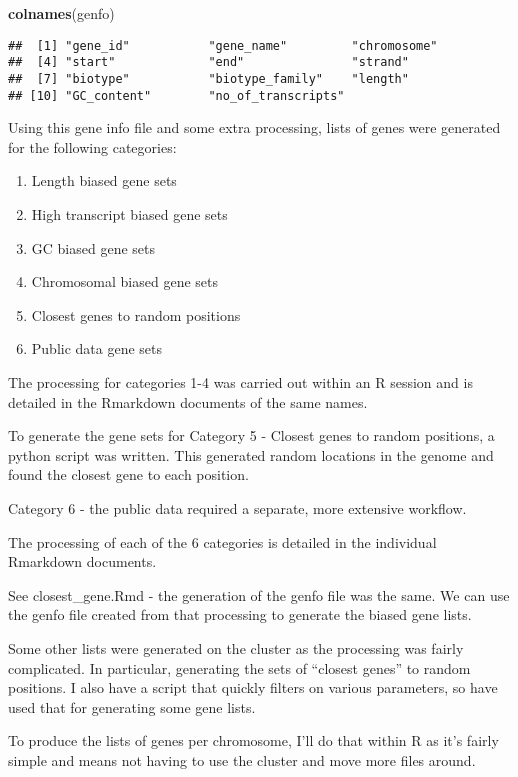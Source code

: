 \documentclass[]{article}
\newenvironment{Shaded}{\begin{snugshade}}{\end{snugshade}}
\newcommand{\KeywordTok}[1]{\textcolor[rgb]{0.13,0.29,0.53}{\textbf{#1}}}
\newcommand{\NormalTok}[1]{#1}
\providecommand{\tightlist}{%
  \setlength{\itemsep}{0pt}\setlength{\parskip}{0pt}}
\begin{document}
\begin{Shaded}
\begin{Highlighting}[]
\KeywordTok{colnames}\NormalTok{(genfo)}
\end{Highlighting}
\end{Shaded}

\begin{verbatim}
##  [1] "gene_id"           "gene_name"         "chromosome"       
##  [4] "start"             "end"               "strand"           
##  [7] "biotype"           "biotype_family"    "length"           
## [10] "GC_content"        "no_of_transcripts"
\end{verbatim}

Using this gene info file and some extra processing, lists of genes were
generated for the following categories:

\begin{enumerate}
\def\labelenumi{\arabic{enumi}.}
\tightlist
\item
  Length biased gene sets
\item
  High transcript biased gene sets
\item
  GC biased gene sets
\item
  Chromosomal biased gene sets
\item
  Closest genes to random positions
\item
  Public data gene sets
\end{enumerate}

The processing for categories 1-4 was carried out within an R session
and is detailed in the Rmarkdown documents of the same names.

To generate the gene sets for Category 5 - Closest genes to random
positions, a python script was written. This generated random locations
in the genome and found the closest gene to each position.

Category 6 - the public data required a separate, more extensive
workflow.

The processing of each of the 6 categories is detailed in the individual
Rmarkdown documents.

See closest\_gene.Rmd - the generation of the genfo file was the same.
We can use the genfo file created from that processing to generate the
biased gene lists.

Some other lists were generated on the cluster as the processing was
fairly complicated. In particular, generating the sets of ``closest
genes'' to random positions. I also have a script that quickly filters
on various parameters, so have used that for generating some gene lists.

To produce the lists of genes per chromosome, I'll do that within R as
it's fairly simple and means not having to use the cluster and move more
files around.
\end{document}
